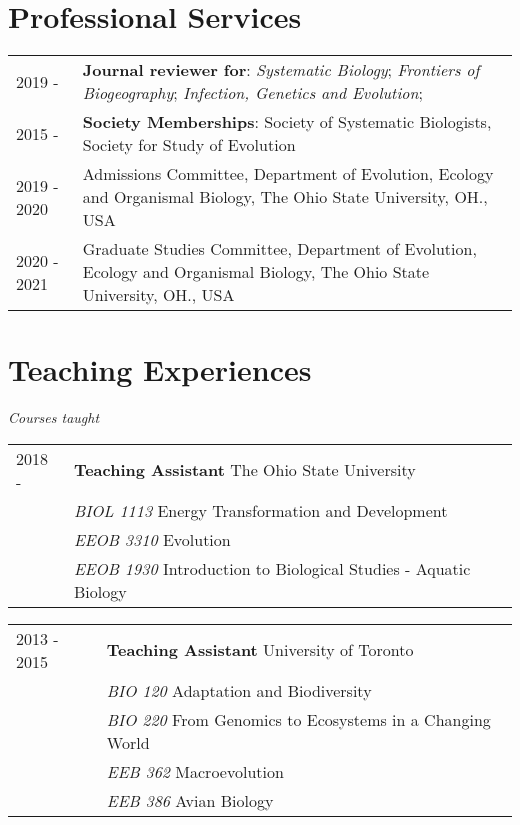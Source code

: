 \documentclass[10pt]{article}
\begin{document}
\section*{Professional Services}
\begin{longtable}{p{}  p{}}

2019 -  &	\textbf{Journal reviewer for}: \textit{Systematic Biology}; \textit{Frontiers of Biogeography}; \textit{Infection, Genetics and Evolution};\\
2015 - &  \textbf{Society Memberships}: Society of Systematic Biologists, Society for Study of Evolution\\
2019 - 2020 &	Admissions Committee, Department of Evolution, Ecology and Organismal Biology, The Ohio State University, OH., USA\\
2020 - 2021 &  Graduate Studies Committee, Department of Evolution, Ecology and Organismal Biology, The Ohio State University, OH., USA


\end{longtable}


\section*{Teaching Experiences}
\textit{Courses taught}

\begin{longtable}{p{}  p{}}

2018 -  &	\textbf{Teaching Assistant} The Ohio State University\\
 & \textit{BIOL 1113} Energy Transformation and Development\\
& \textit{EEOB 3310} Evolution\\
& \textit{EEOB 1930} Introduction to Biological Studies - Aquatic Biology\\

\end{longtable}



\begin{longtable}{p{}  p{}}

2013 - 2015 & \textbf{Teaching Assistant} University of Toronto\\
 & \textit{BIO 120} Adaptation and Biodiversity\\
 & \textit{BIO 220} From Genomics to Ecosystems in a Changing World\\
& \textit{EEB 362} Macroevolution\\
& \textit{EEB 386} Avian Biology\\

\end{longtable}
\end{document}
